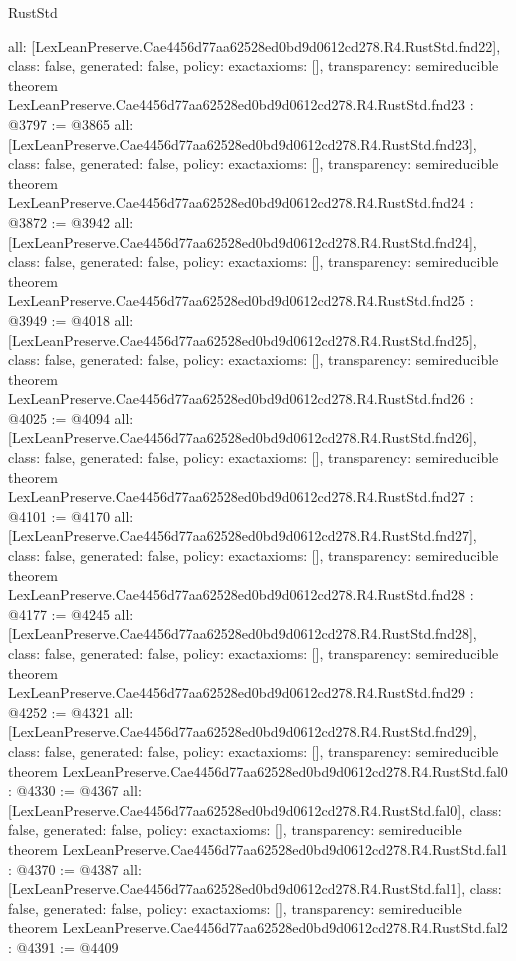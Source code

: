 \begin{lexlean}{RustStd}
\begin{coremodule}
{  all: [LexLeanPreserve.Cae4456d77aa62528ed0bd9d0612cd278.R4.RustStd.fnd22],
  class: false,
  generated: false,
  policy: exact{axioms: []},
  transparency: semireducible
}
theorem LexLeanPreserve.Cae4456d77aa62528ed0bd9d0612cd278.R4.RustStd.fnd23 : @3797 := @3865 {
  all: [LexLeanPreserve.Cae4456d77aa62528ed0bd9d0612cd278.R4.RustStd.fnd23],
  class: false,
  generated: false,
  policy: exact{axioms: []},
  transparency: semireducible
}
theorem LexLeanPreserve.Cae4456d77aa62528ed0bd9d0612cd278.R4.RustStd.fnd24 : @3872 := @3942 {
  all: [LexLeanPreserve.Cae4456d77aa62528ed0bd9d0612cd278.R4.RustStd.fnd24],
  class: false,
  generated: false,
  policy: exact{axioms: []},
  transparency: semireducible
}
theorem LexLeanPreserve.Cae4456d77aa62528ed0bd9d0612cd278.R4.RustStd.fnd25 : @3949 := @4018 {
  all: [LexLeanPreserve.Cae4456d77aa62528ed0bd9d0612cd278.R4.RustStd.fnd25],
  class: false,
  generated: false,
  policy: exact{axioms: []},
  transparency: semireducible
}
theorem LexLeanPreserve.Cae4456d77aa62528ed0bd9d0612cd278.R4.RustStd.fnd26 : @4025 := @4094 {
  all: [LexLeanPreserve.Cae4456d77aa62528ed0bd9d0612cd278.R4.RustStd.fnd26],
  class: false,
  generated: false,
  policy: exact{axioms: []},
  transparency: semireducible
}
theorem LexLeanPreserve.Cae4456d77aa62528ed0bd9d0612cd278.R4.RustStd.fnd27 : @4101 := @4170 {
  all: [LexLeanPreserve.Cae4456d77aa62528ed0bd9d0612cd278.R4.RustStd.fnd27],
  class: false,
  generated: false,
  policy: exact{axioms: []},
  transparency: semireducible
}
theorem LexLeanPreserve.Cae4456d77aa62528ed0bd9d0612cd278.R4.RustStd.fnd28 : @4177 := @4245 {
  all: [LexLeanPreserve.Cae4456d77aa62528ed0bd9d0612cd278.R4.RustStd.fnd28],
  class: false,
  generated: false,
  policy: exact{axioms: []},
  transparency: semireducible
}
theorem LexLeanPreserve.Cae4456d77aa62528ed0bd9d0612cd278.R4.RustStd.fnd29 : @4252 := @4321 {
  all: [LexLeanPreserve.Cae4456d77aa62528ed0bd9d0612cd278.R4.RustStd.fnd29],
  class: false,
  generated: false,
  policy: exact{axioms: []},
  transparency: semireducible
}
theorem LexLeanPreserve.Cae4456d77aa62528ed0bd9d0612cd278.R4.RustStd.fal0 : @4330 := @4367 {
  all: [LexLeanPreserve.Cae4456d77aa62528ed0bd9d0612cd278.R4.RustStd.fal0],
  class: false,
  generated: false,
  policy: exact{axioms: []},
  transparency: semireducible
}
theorem LexLeanPreserve.Cae4456d77aa62528ed0bd9d0612cd278.R4.RustStd.fal1 : @4370 := @4387 {
  all: [LexLeanPreserve.Cae4456d77aa62528ed0bd9d0612cd278.R4.RustStd.fal1],
  class: false,
  generated: false,
  policy: exact{axioms: []},
  transparency: semireducible
}
theorem LexLeanPreserve.Cae4456d77aa62528ed0bd9d0612cd278.R4.RustStd.fal2 : @4391 := @4409 {
}
\end{coremodule}
\end{lexlean}
